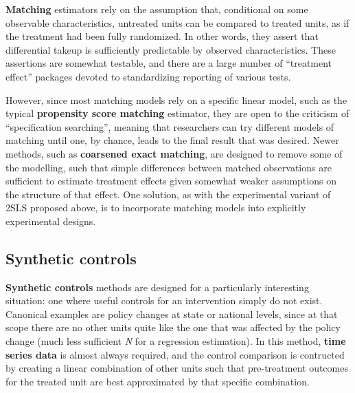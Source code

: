 \textbf{Matching} estimators rely on the assumption that,
conditional on some observable characteristics,
untreated units can be compared to treated units,
as if the treatment had been fully randomized.
In other words, they assert that differential takeup
is sufficiently predictable by observed characteristics.
These assertions are somewhat testable,
and there are a large number of ``treatment effect''
packages devoted to standardizing reporting of various tests.

However, since most matching models rely on a specific linear model,
such as the typical \textbf{propensity score matching} estimator,
they are open to the criticism of ``specification searching'',
meaning that researchers can try different models of matching
until one, by chance, leads to the final result that was desired.
Newer methods, such as \textbf{coarsened exact matching}\cite{iacus2012causal},
are designed to remove some of the modelling,
such that simple differences between matched observations
are sufficient to estimate treatment effects
given somewhat weaker assumptions on the structure of that effect.
One solution, as with the experimental variant of 2SLS proposed above,
is to incorporate matching models into explicitly experimental designs.

\subsection{Synthetic controls}

\textbf{Synthetic controls} methods\cite{abadie2015comparative}
are designed for a particularly interesting situation:
one where useful controls for an intervention simply do not exist.
Canonical examples are policy changes at state or national levels,
since at that scope there are no other units quite like
the one that was affected by the policy change
(much less sufficient \textit{N} for a regression estimation).\cite{gobillon2016regional}
In this method, \textbf{time series data} is almost always required,
and the control comparison is contructed by creating
a linear combination of other units such that pre-treatment outcomes
for the treated unit are best approximated by that specific combination.
